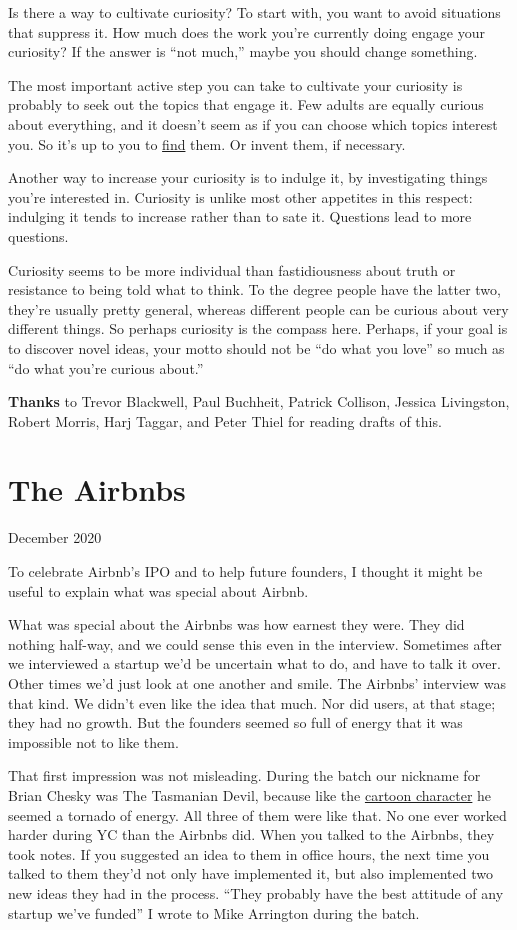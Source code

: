 \documentclass[12pt]{book}
\begin{document}
Is there a way to cultivate curiosity? To start with, you want to avoid
situations that suppress it. How much does the work you're currently
doing engage your curiosity? If the answer is ``not much,'' maybe you
should change something.

The most important active step you can take to cultivate your curiosity
is probably to seek out the topics that engage it. Few adults are
equally curious about everything, and it doesn't seem as if you can
choose which topics interest you. So it's up to you to
\href{genius.html}{find} them. Or invent them, if necessary.

Another way to increase your curiosity is to indulge it, by
investigating things you're interested in. Curiosity is unlike most
other appetites in this respect: indulging it tends to increase rather
than to sate it. Questions lead to more questions.

Curiosity seems to be more individual than fastidiousness about truth or
resistance to being told what to think. To the degree people have the
latter two, they're usually pretty general, whereas different people can
be curious about very different things. So perhaps curiosity is the
compass here. Perhaps, if your goal is to discover novel ideas, your
motto should not be ``do what you love'' so much as ``do what you're
curious about.''


\textbf{Thanks} to Trevor Blackwell, Paul Buchheit, Patrick Collison,
Jessica Livingston, Robert Morris, Harj Taggar, and Peter Thiel for
reading drafts of this.
\chapter{The Airbnbs}

December 2020

To celebrate Airbnb's IPO and to help future founders, I thought it
might be useful to explain what was special about Airbnb.

What was special about the Airbnbs was how earnest they were. They did
nothing half-way, and we could sense this even in the interview.
Sometimes after we interviewed a startup we'd be uncertain what to do,
and have to talk it over. Other times we'd just look at one another and
smile. The Airbnbs' interview was that kind. We didn't even like the
idea that much. Nor did users, at that stage; they had no growth. But
the founders seemed so full of energy that it was impossible not to like
them.

That first impression was not misleading. During the batch our nickname
for Brian Chesky was The Tasmanian Devil, because like the
\href{http://www.youtube.com/watch?v=StG2u5qfFRg&t=2m27s}{cartoon
character} he seemed a tornado of energy. All three of them were like
that. No one ever worked harder during YC than the Airbnbs did. When you
talked to the Airbnbs, they took notes. If you suggested an idea to them
in office hours, the next time you talked to them they'd not only have
implemented it, but also implemented two new ideas they had in the
process. ``They probably have the best attitude of any startup we've
funded'' I wrote to Mike Arrington during the batch.
\end{document}
